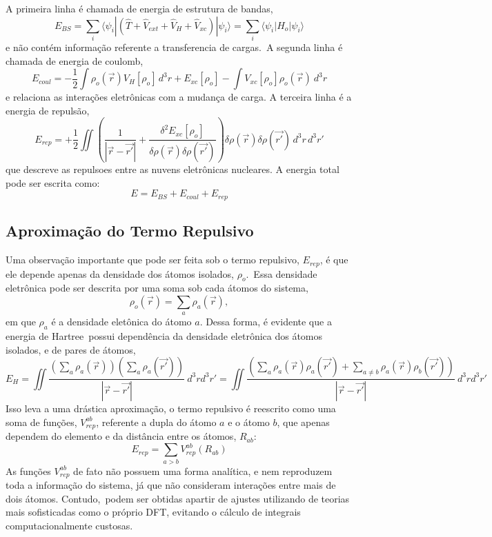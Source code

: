 A primeira linha é chamada de energia de estrutura de bandas,
\begin{equation}
    E_{BS}=\sum_i \langle\psi_i|\left(\hat T + \hat V_{ext} + \hat V_H + \hat V_{xc}\right)|\psi_i\rangle = \sum_i \langle\psi_i|H_o|\psi_i\rangle
\end{equation}
e não contém informação referente a transferencia de cargas.\
A segunda linha é chamada de energia de coulomb,
\begin{equation}
    E_{coul} = - \frac{1}{2}\int\rho_o(\vec{r})V_{H}[\rho_o] \,d^3r + E_{xc}[\rho_o] - \int V_{xc}[\rho_o] \rho_o(\vec{r}) ~d^3 r 
\end{equation}
e relaciona as interações eletrônicas com a mudança de carga.
A terceira linha é a energia de repulsão,
\begin{equation}
    E_{rep} = + \frac{1}{2}\iint \left(\frac{1}{|\vec{r}-\vec{r'}|} + \frac{\delta^2 E_{xc}[\rho_o]}{\delta\rho(\vec{r})\delta\rho(\vec{r'})}\right) \delta\rho(\vec{r})\delta\rho(\vec{r'})\,d^3r\,d^3r' 
\end{equation}
que descreve as repulsoes entre as nuvens eletrônicas nucleares.
A energia total pode ser escrita como:
\begin{equation}
    E = E_{BS} + E_{coul} + E_{rep}
\end{equation}

\subsection{Aproximação do Termo Repulsivo}

Uma observação importante que pode ser feita sob o termo repulsivo, $E_{rep}$, é que ele depende apenas da densidade dos átomos isolados, $\rho_o$.\
Essa densidade eletrônica pode ser descrita por uma soma sob cada átomos do sistema,
\begin{equation}
    \rho_o(\vec{r}) = \sum_a \rho_a(\vec{r}),
\end{equation}
em que $\rho_a$ é a densidade eletônica do átomo $a$. Dessa forma, é evidente que a energia de Hartree\
possui dependência da densidade eletrônica dos átomos isolados, e de pares de átomos,
\begin{equation}
    E_H = \iint \frac{\left(\sum_a \rho_a(\vec{r})\right)\left(\sum_a \rho_a(\vec{r'})\right)}{|\vec{r}-\vec{r'}|} ~d^3rd^3r' = \iint \frac{\left(\sum_{a} \rho_a(\vec{r})\rho_a(\vec{r'})+\sum_{a\neq b} \rho_a(\vec{r})\rho_b(\vec{r'})\right)}{|\vec{r}-\vec{r'}|} ~d^3rd^3r'
\end{equation}
Isso leva a uma drástica aproximação, o termo repulsivo é reescrito como uma soma de funções, $V^{ab}_{rep}$, referente a dupla do átomo $a$ e o átomo $b$, que apenas dependem do elemento e da distância entre os átomos, $R_{ab}$:
\begin{equation}
    E_{rep} = \sum_{a > b} V^{ab}_{rep}(R_{ab})
\end{equation}
As funções $V^{ab}_{rep}$ de fato não possuem uma forma analítica, e nem reproduzem toda a informação do sistema, já que não consideram interações entre mais de dois átomos. Contudo,\
podem ser obtidas apartir de ajustes utilizando de teorias mais sofisticadas como o próprio DFT, evitando o cálculo de integrais computacionalmente custosas.

